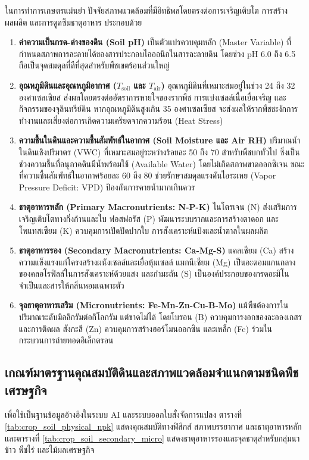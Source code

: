 ในการทำการเกษตรแม่นยำ ปัจจัยสภาพแวดล้อมที่มีอิทธิพลโดยตรงต่อการเจริญเติบโต การสร้างผลผลิต และการดูดซึมธาตุอาหาร ประกอบด้วย
\begin{enumerate}
    \item \textbf{ค่าความเป็นกรด-ด่างของดิน (Soil pH)} เป็นตัวแปรควบคุมหลัก (Master Variable) ที่กำหนดสภาพการละลายได้ของสารประกอบไอออนิกในสารละลายดิน โดยช่วง pH 6.0 ถึง 6.5 ถือเป็นจุดสมดุลที่ดีที่สุดสำหรับพืชเขตร้อนส่วนใหญ่
    \item \textbf{อุณหภูมิดินและอุณหภูมิอากาศ ($T_{\text{soil}}$ และ $T_{\text{air}}$)} อุณหภูมิดินที่เหมาะสมอยู่ในช่วง 24 ถึง 32 องศาเซลเซียส ส่งผลโดยตรงต่ออัตราการหายใจของรากพืช การแบ่งเซลล์เนื้อเยื่อเจริญ และกิจกรรมของจุลินทรีย์ดิน หากอุณหภูมิดินสูงเกิน 35 องศาเซลเซียส จะส่งผลให้รากพืชชะงักการทำงานและเสี่ยงต่อการเกิดความเครียดจากความร้อน (Heat Stress)
    \item \textbf{ความชื้นในดินและความชื้นสัมพัทธ์ในอากาศ (Soil Moisture และ Air RH)} ปริมาณน้ำในดินเชิงปริมาตร (VWC) ที่เหมาะสมอยู่ระหว่างร้อยละ 50 ถึง 70 สำหรับพืชบกทั่วไป ซึ่งเป็นช่วงความชื้นที่อนุภาคดินมีน้ำพร้อมใช้ (Available Water) โดยไม่เกิดสภาพขาดออกซิเจน ขณะที่ความชื้นสัมพัทธ์ในอากาศร้อยละ 60 ถึง 80 ช่วยรักษาสมดุลแรงดันไอระเหย (Vapor Pressure Deficit: VPD) ป้องกันการคายน้ำมากเกินควร
    \item \textbf{ธาตุอาหารหลัก (Primary Macronutrients: N-P-K)} ไนโตรเจน (N) ส่งเสริมการเจริญเติบโตทางกิ่งก้านและใบ ฟอสฟอรัส (P) พัฒนาระบบรากและการสร้างตาดอก และโพแทสเซียม (K) ควบคุมการเปิดปิดปากใบ การสังเคราะห์แป้งและน้ำตาลในผลผลิต
    \item \textbf{ธาตุอาหารรอง (Secondary Macronutrients: Ca-Mg-S)} แคลเซียม (Ca) สร้างความแข็งแรงแก่โครงสร้างผนังเซลล์และเยื่อหุ้มเซลล์ แมกนีเซียม (Mg) เป็นอะตอมแกนกลางของคลอโรฟิลล์ในการสังเคราะห์ด้วยแสง และกำมะถัน (S) เป็นองค์ประกอบของกรดอะมิโนจำเป็นและสารให้กลิ่นหอมเฉพาะตัว
    \item \textbf{จุลธาตุอาหารเสริม (Micronutrients: Fe-Mn-Zn-Cu-B-Mo)} แม้พืชต้องการในปริมาณระดับมิลลิกรัมต่อกิโลกรัม แต่ขาดไม่ได้ โดยโบรอน (B) ควบคุมการงอกของละอองเกสรและการติดผล สังกะสี (Zn) ควบคุมการสร้างฮอร์โมนออกซิน และเหล็ก (Fe) ร่วมในกระบวนการถ่ายทอดอิเล็กตรอน
\end{enumerate}

\subsection{เกณฑ์มาตรฐานคุณสมบัติดินและสภาพแวดล้อมจำแนกตามชนิดพืชเศรษฐกิจ}

เพื่อใช้เป็นฐานข้อมูลอ้างอิงในระบบ AI และระบบออกใบสั่งจัดการแปลง ตารางที่ \ref{tab:crop_soil_physical_npk} แสดงคุณสมบัติทางฟิสิกส์ สภาพบรรยากาศ และธาตุอาหารหลัก และตารางที่ \ref{tab:crop_soil_secondary_micro} แสดงธาตุอาหารรองและจุลธาตุสำหรับกลุ่มนาข้าว พืชไร่ และไม้ผลเศรษฐกิจ

